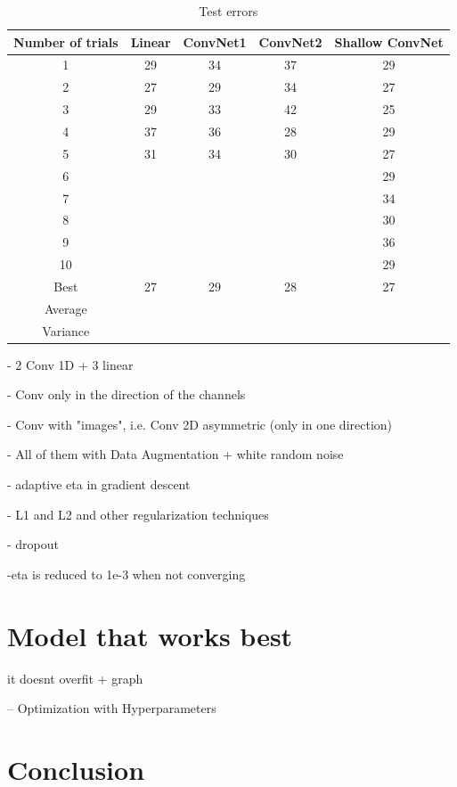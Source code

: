 \documentclass{article}
\begin{document}
 \begin{table}
 \begin{center}
    \begin{tabular}{|  c | c | c  | c |c |}
    \hline
    Number of trials & Linear & ConvNet1 & ConvNet2 & Shallow ConvNet \\ \hline
    1 & 29 & 34 & 37 & 29 \\
    2 & 27 & 29 & 34 & 27\\
    3 & 29 & 33 & 42 & 25\\
    4 & 37 & 36 & 28 & 29 \\
    5 & 31& 34 & 30 & 27 \\
    6 & & & & 29 \\
    7 & & & & 34\\
    8 & & & & 30 \\
    9 & & & & 36 \\
    10 & & & & 29 \\
        \hline
    Best & 27  & 29 & 28 &27 \\
    Average & & & &\\
    Variance & & & &\\
        \hline
    \end{tabular}
        \caption{Test errors}
\end{center}
\end{table}



 - 2 Conv 1D + 3 linear 
 
 - Conv only in the direction of the channels \cite{zheng2014time}
 
 - Conv with "images", i.e. Conv 2D asymmetric (only in one direction) \cite{schirrmeister2017deep}
 
 - All of them with Data Augmentation + white random noise \cite{wang2018data}
 
 -  adaptive eta in gradient descent 
 
 - L1 and L2 and other regularization techniques  \cite{goodfellow2016deep} 
 
 - dropout 
 
 -eta is reduced to 1e-3 when not converging
 
 
  \section{Model that works best}\label{sec_themodel}
 
 it doesnt overfit + graph
 
 
 -- Optimization with Hyperparameters
  
 \section{Conclusion}\label{sec_conclusion}
 
 

 
  
  
  
\end{document}
